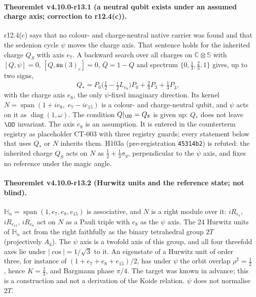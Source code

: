 \paragraph{Theoremlet v4.10.0-r13.1 (a neutral qubit exists under an assumed charge axis; correction to r12.4(c)).}
r12.4(c) says that no colour- and charge-neutral native carrier was found and that the sedenion cycle \(\psi\) moves the
charge axis.  That sentence holds for the inherited charge \(Q_S\) with axis \(e_7\).  A backward search over all charges on
\(\mathbb C\otimes\mathbb S\) with \([Q,\psi]=0\), \([Q,\mathfrak{su}(3)_c]=0\), \(\bar Q=1-Q\) and spectrum
\(\{0,\tfrac13,\tfrac23,1\}\) gives, up to two signs,
\[
Q_*=P_0\bigl(\tfrac12-\tfrac i2 L_{e_8}\bigr)P_0+\tfrac23P_3+\tfrac13P_{\bar3},
\]
with the charge axis \(e_8\), the only \(\psi\)-fixed imaginary direction.  Its kernel
\(N=\operatorname{span}(1+ie_8,\;e_7-ie_{15})\) is a colour- and charge-neutral qubit, and \(\psi\) acts on it as
\(\operatorname{diag}(1,\omega)\).  The condition \(Q|_{\OO}=Q_8\) is given up: \(Q_*\) does not leave \(\OO\) invariant.
The axis \(e_8\) is an assumption.  It is entered in the counterterm registry as placeholder CT-003 with three registry
guards; every statement below that uses \(Q_*\) or \(N\) inherits them.  H103a (pre-registration \texttt{45314b2}) is
refuted: the inherited charge \(Q_S\) acts on \(N\) as \(\tfrac12+\tfrac13\sigma_y\), perpendicular to the \(\psi\) axis, and fixes
no reference under the magic angle.

\paragraph{Theoremlet v4.10.0-r13.2 (Hurwitz units and the reference state; not blind).}
\(\mathbb H_n=\operatorname{span}(1,e_7,e_8,e_{15})\) is associative, and \(N\) is a right module over it: \(iR_{e_7}\),
\(iR_{e_{15}}\), \(iR_{e_8}\) act on \(N\) as a Pauli triple with \(e_8\) as the \(\psi\) axis.  The 24 Hurwitz units of
\(\mathbb H_n\) act from the right faithfully as the binary tetrahedral group \(2T\) (projectively \(A_4\)).  The \(\psi\) axis is
a twofold axis of this group, and all four threefold axes lie under \(|\cos|=1/\sqrt3\) to it.  An eigenstate of a Hurwitz
unit of order three, for instance of \((1+e_7+e_8+e_{15})/2\), has under \(\psi\) the orbit overlap \(\rho^2=\tfrac12\), hence
\(K=\tfrac23\), and Bargmann phase \(\pi/4\).  The target was known in advance; this is a construction and not a derivation of
the Koide relation.  \(\psi\) does not normalise \(2T\).

